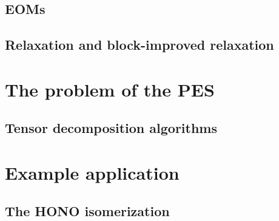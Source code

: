 \documentclass{beamer}
\begin{document}
\subsection{EOMs}
\label{eom}

\subsection{Relaxation and block-improved relaxation}
\label{relax}



\section{The problem of the PES}
\label{probpes}
\subsection{Tensor decomposition algorithms}
\label{tdec}

\section{Example application}
\label{applic}
\subsection{The HONO isomerization}
\label{hono}

\subsection[Bibliography]{}
\label{biblio}
\end{document}
